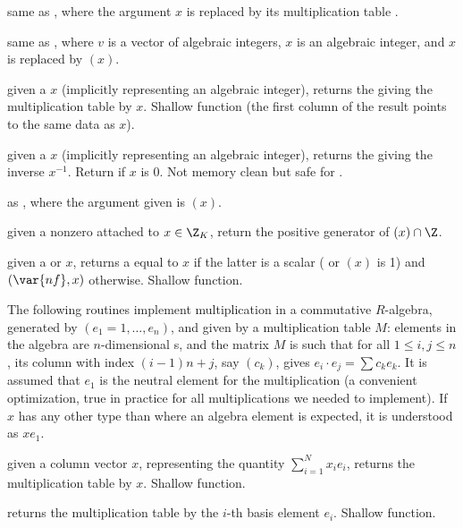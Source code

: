  same as ,
where the argument $x$ is replaced by its multiplication table .

 same as ,
where $v$ is a vector of algebraic integers, $x$ is an algebraic
integer, and $x$ is replaced by $(x)$.

 given a  $x$ (implicitly
representing an algebraic integer), returns the  giving the
multiplication table by $x$. Shallow function (the first column of the result
points to the same data as $x$).

 given a  $x$ (implicitly
representing an algebraic integer), returns the  giving the
inverse $x^{-1}$. Return  if $x$ is $0$.
Not memory clean but safe for .

 as , where
the argument given is $(x)$.

 given a nonzero 
 attached to $x \in \Z_K$, return the positive generator of
$(x)\cap \Z$.

 given a  or 
$x$, returns a  equal to $x$ if the latter is a scalar
( or $(x)$ is 1) and
$(\var{nf},x)$ otherwise. Shallow function.


The following routines implement multiplication in a commutative $R$-algebra,
generated by $(e_1 = 1,\dots, e_n)$, and given by a multiplication table $M$:
elements in the algebra are $n$-dimensional s, and the matrix
$M$ is such that for all $1\leq i,j\leq n$, its column with index $(i-1)n +
j$, say $(c_k)$, gives $e_i\cdot e_j = \sum c_k e_k$. It is assumed that
$e_1$ is the neutral element for the multiplication (a convenient
optimization, true in practice for all multiplications we needed to implement).
If $x$ has any other type than  where an algebra element is
expected, it is understood as $x e_1$.

 given a column vector $x$, representing
the quantity $\sum_{i=1}^N x_i e_i$, returns the multiplication table by $x$.
Shallow function.

 returns the multiplication table
by the $i$-th basis element $e_i$. Shallow function.

